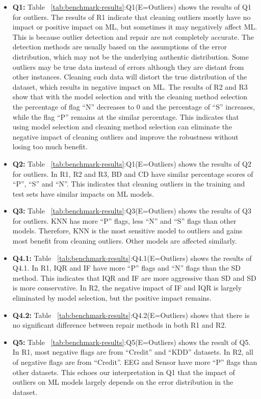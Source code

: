 \begin{itemize}
	\item {
		\textbf{Q1:} Table ~\ref{tab:benchmark-results}:Q1(E=Outliers) shows the results of Q1 for outliers.
		The results of R1 indicate that cleaning outliers mostly have no impact or positive impact on ML, but sometimes it may negatively
		affect ML. This is because outlier detection and repair are not completely accurate. The detection methods are usually based on the
		assumptions of the error distribution, which may not be the underlying authentic distribution. Some outliers may be true data instead
		of errors although they are distant from other instances. Cleaning
		such data will distort the true distribution of the dataset, which results in negative impact on ML.
		The results of R2 and R3 show that with the model selection and with the cleaning method selection the percentage of flag “N” decreases to 0 and the percentage of “S” increases, while the flag “P”
		remains at the similar percentage. This indicates that using model selection and cleaning method selection can eliminate the negative
		impact of cleaning outliers and improve the robustness without losing too much benefit.
	}
	\item {
		\textbf{Q2:} Table ~\ref{tab:benchmark-results}:Q1(E=Outliers) shows the results of Q2 for outliers. 
		In R1, R2 and R3, BD and CD have similar percentage scores of “P”, “S” and “N”. This indicates that cleaning outliers in the
		training and test sets have similar impacts on ML models.
	}
	\item {
		\textbf{Q3:} Table ~\ref{tab:benchmark-results}:Q3(E=Outliers) shows the results of Q3 for outliers. KNN has more “P” flags, less “N” and “S” flags than other models. Therefore, KNN is the most sensitive model to outliers
		and gains most benefit from cleaning outliers. Other models are affected similarly.
	} 
	\item {
	\textbf{Q4.1:} Table ~\ref{tab:benchmark-results}:Q4.1(E=Outliers) shows the results of Q4.1. In
		R1, IQR and IF have more “P” flags and “N” flags than the SD method. This indicates that IQR and IF are more aggressive than SD and SD is more conservative. In R2, the negative impact of IF and IQR is largely eliminated by model selection, but the positive impact remains.
	}
	\item {
		\textbf{Q4.2:} Table ~\ref{tab:benchmark-results}:Q4.2(E=Outliers) shows that there is no significant difference between repair methods in both R1 and R2.
	}
	\item {
		\textbf{Q5:} Table ~\ref{tab:benchmark-results}:Q5(E=Outliers) shows the result of Q5. In R1,
		most negative flags are from “Credit” and “KDD” datasets. In R2, all of negative flags are from “Credit”. EEG and Sensor have more
		“P” flags than other datasets. This echoes our interpretation in Q1 that the impact of outliers on ML models largely depends on the
		error distribution in the dataset.
	}
\end{itemize}

